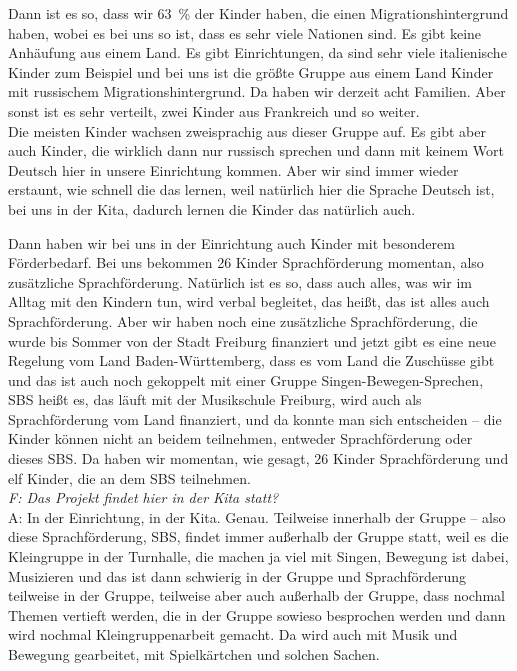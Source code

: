 \begin{linenumbers*}
Dann ist es so, dass wir 63~\% der Kinder haben, die einen Migrationshintergrund haben, wobei es bei uns so ist, dass es sehr viele Nationen sind. Es gibt keine Anhäufung aus einem Land. Es gibt Einrichtungen, da sind sehr viele italienische Kinder zum Beispiel und bei uns ist die größte Gruppe aus einem Land Kinder mit russischem Migrationshintergrund. Da haben wir derzeit acht Familien. Aber sonst ist es sehr verteilt, zwei Kinder aus Frankreich und so weiter.\\
Die meisten Kinder wachsen zweisprachig aus dieser Gruppe auf. Es gibt aber auch Kinder, die wirklich dann nur russisch sprechen und dann mit keinem Wort Deutsch hier in unsere Einrichtung kommen. Aber wir sind immer wieder erstaunt, wie schnell die das lernen, weil natürlich hier die Sprache Deutsch ist, bei uns in der Kita, dadurch lernen die Kinder das natürlich auch. 

Dann haben wir bei uns in der Einrichtung auch Kinder mit besonderem Förderbedarf. Bei uns bekommen 26 Kinder Sprachförderung momentan, also zusätzliche Sprachförderung. Natürlich ist es so, dass auch alles, was wir im Alltag mit den Kindern tun, wird verbal begleitet, das heißt, das ist alles auch Sprachförderung. Aber wir haben noch eine zusätzliche Sprachförderung, die wurde bis Sommer von der Stadt Freiburg finanziert und jetzt gibt es eine neue Regelung vom Land Baden-Württemberg, dass es vom Land die Zuschüsse gibt und das ist auch noch gekoppelt mit einer Gruppe Singen-Bewegen-Sprechen, SBS heißt es, das läuft mit der Musikschule Freiburg, wird auch als Sprachförderung vom Land finanziert, und da konnte man sich entscheiden -- die Kinder können nicht an beidem teilnehmen, entweder Sprachförderung oder dieses SBS. Da haben wir momentan, wie gesagt, 26 Kinder Sprachförderung und elf Kinder, die an dem SBS teilnehmen.\\
\emph{F: Das Projekt findet hier in der Kita statt?}\\ 
A: In der Einrichtung, in der Kita. Genau. Teilweise innerhalb der Gruppe – also diese Sprachförderung, SBS, findet immer außerhalb der Gruppe statt, weil es die Kleingruppe in der Turnhalle, die machen ja viel mit Singen, Bewegung ist dabei, Musizieren und das ist dann schwierig in der Gruppe und Sprachförderung teilweise in der Gruppe, teilweise aber auch außerhalb der Gruppe, dass nochmal Themen vertieft werden, die in der Gruppe sowieso besprochen werden und dann wird nochmal Kleingruppenarbeit gemacht. Da wird auch mit Musik und Bewegung gearbeitet, mit Spielkärtchen und solchen Sachen.  


\end{linenumbers*}
